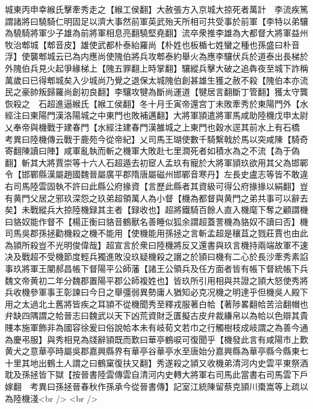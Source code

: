 城東丙申幸緱氏擊牽秀走之【緱工侯翻】大赦張方入京城大掠死者萬計　李流疾篤謂諸將曰驍騎仁明固足以濟大事然前軍英武殆天所相可共受事於前軍【李特以弟驤為驍騎將軍少子雄為前將軍相息亮翻驍堅堯翻】流卒衆推李雄為大都督大將軍益州牧治郫城【郫音皮】雄使武都朴泰紿羅尚【朴姓也板楯七姓蠻之種也孫盛曰朴音浮】使襲郫城云已為内應尚使隗伯將兵攻郫泰約舉火為應李驤伏兵於道泰出長梯於外隗伯兵見火起爭緣梯上【隗五罪翻上時掌翻】驤縱兵擊大破之追犇夜至城下詐稱萬歲曰已得郫城矣入少城尚乃覺之退保太城隗伯創甚雄生獲之赦不殺【隗伯本亦流民之豪帥叛歸羅尚創初良翻】李驤攻犍為斷尚運道【犍居言翻斷丁管翻】獲太守龔恢殺之　石超進逼緱氏【緱工侯翻】冬十月壬寅帝還宫丁未敗牽秀於東陽門外【水經注曰東陽門漢洛陽城之中東門也敗補邁翻】大將軍頴遣將軍馬咸助陸機戊申太尉乂奉帝與機戰于建春門【水經注建春門漢雒城之上東門也穀水逕其前水上有石橋　考異曰陸機傳云戰于鹿苑今從帝紀】乂司馬王瑚使數千騎繫戟於馬以突咸陳【騎奇寄翻陳讀曰陣】咸軍亂執而斬之機軍大敗赴七里澗死者如積水為之不流【為于偽翻】斬其大將賈崇等十六人石超遁去初䆠人孟玖有寵於大將軍頴玖欲用其父為邯鄲令【邯鄲縣漢屬趙國魏晉屬廣平郡隋唐屬磁州邯鄲音寒丹】左長史盧志等皆不敢違右司馬陸雲固執不許曰此縣公府掾資【言歷此縣者其資級可得公府掾掾以絹翻】豈有黄門父居之邪玖深怨之玖弟超領萬人為小督【機為都督與黄門之弟共事可以辭去矣】未戰縱兵大掠陸機録其主者【録收也】超將鐵騎百餘人直入機麾下奪之顧謂機曰貉奴能作督不【楊正衡曰貉音鶴獸名善睡似狐余謂超蓋詈機為貉奴不讀曰否】機司馬吳郡孫拯勸機殺之機不能用【使機能用孫拯之言斬孟超是穰苴之戮莊賈也由此為頴所殺豈不光明俊偉哉】超宣言於衆曰陸機將反又還書與玖言機持兩端故軍不速决及戰超不受機節度輕兵獨進敗没玖疑機殺之譖之於頴曰機有二心於長沙牽秀素諂事玖將軍王闡郝昌帳下督陽平公師藩【諸王公領兵及任方面者皆有帳下督統帳下兵魏文帝黄初二年分魏郡置陽平郡公師複姓也】皆玖所引用相與共證之頴大怒使秀將兵收機參軍事王彰諫曰今日之舉彊弱異勢庸人猶知必克况機之明達乎但機吳人殿下用之太過北土舊將皆疾之耳頴不從機聞秀至釋戎服著白帢【著陟畧翻帢苦洽翻帽也弁缺四隅謂之帢晉志曰魏武以天下凶荒資財乏匱擬古皮弁裁縑帛以為帢以色辯其貴賤本施軍飾非為國容徐爰曰俗說帢本未有岐荀文若巾之行觸樹枝成岐謂之為善今通為慶弔服】與秀相見為牋辭頴既而歎曰華亭鶴唳可復聞乎【機發此言有咸陽市上歎黄犬之意華亭時屬吳郡嘉興縣界有華亭谷華亭水至唐始分嘉興縣為華亭縣今縣東七十里其地出鶴土人謂之曰鶴窠復扶又翻】秀遂殺之頴又收機弟清河内史雲平東祭酒耽及孫拯皆下獄【按晉書陸雲傳雲自清河内史轉大將軍右司馬此當書右司馬雲下戶嫁翻　考異曰孫拯晉春秋作孫承今從晉書傳】記室江統陳留蔡克頴川棗嵩等上疏以為陸機淺<br />
<br />
